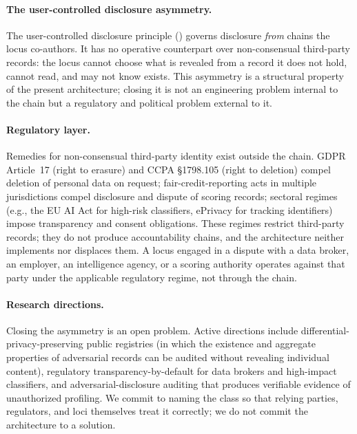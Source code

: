 \documentclass[11pt,a4paper,parskip=half-,DIV=12,headings=standardclasses]{scrartcl}
\theoremstyle{ncthm}
\theoremstyle{ncdef}
\begin{document}
\paragraph{The user-controlled disclosure asymmetry.} The
user-controlled disclosure principle ()
governs disclosure \emph{from} chains the locus co-authors. It has no
operative counterpart over non-consensual third-party records: the
locus cannot choose what is revealed from a record it does not hold,
cannot read, and may not know exists. This asymmetry is a structural
property of the present architecture; closing it is not an engineering
problem internal to the chain but a regulatory and political problem
external to it.

\paragraph{Regulatory layer.} Remedies for non-consensual third-party
identity exist outside the chain. GDPR Article~17 (right to erasure)
and CCPA \S{}1798.105 (right to deletion) compel deletion of personal
data on request; fair-credit-reporting acts in multiple jurisdictions
compel disclosure and dispute of scoring records; sectoral regimes
(e.g., the EU AI Act for high-risk classifiers, ePrivacy for tracking
identifiers) impose transparency and consent obligations. These
regimes restrict third-party records; they do not produce
accountability chains, and the architecture neither implements nor
displaces them. A locus engaged in a dispute with a data broker, an
employer, an intelligence agency, or a scoring authority operates
against that party under the applicable regulatory regime, not through
the chain.

\paragraph{Research directions.} Closing the asymmetry is an open
problem. Active directions include differential-privacy-preserving
public registries (in which the existence and aggregate properties of
adversarial records can be audited without revealing individual
content), regulatory transparency-by-default for data brokers and
high-impact classifiers, and adversarial-disclosure auditing that
produces verifiable evidence of unauthorized profiling. We commit to
naming the class so that relying parties, regulators, and loci
themselves treat it correctly; we do not commit the architecture to
a solution.
\end{document}

